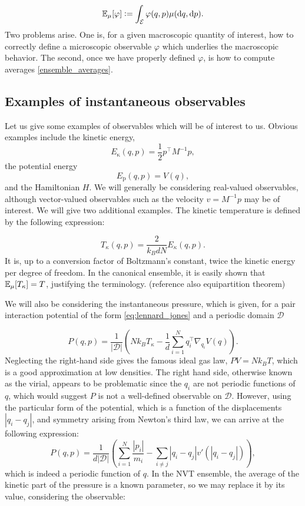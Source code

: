 \begin{equation}
    \label{eq:ensemble_averages}
    \mathbb{E}_\mu[\varphi] \mathrel{\mathop:}= \int_{\mathcal E} \varphi(q,p) \mu(\mathrm{d}q,\mathrm{d}p).
\end{equation}
Two problems arise. One is, for a given macroscopic quantity of interest, how to correctly define a microscopic observable $\varphi$ which underlies the macroscopic behavior. The second, once we have properly defined $\varphi$, is how to compute averages \eqref{ensemble_averages}. 

\subsection{Examples of instantaneous observables}
Let us give some examples of observables which will be of interest to us. Obvious examples include the kinetic energy,
$$ E_{\mathrm \kappa} (q,p) = \frac 12 p^\intercal M^{-1} p,$$
the potential energy
$$ E_{\mathrm p}(q,p)=V(q),$$
and the Hamiltonian $H$. We will generally be considering real-valued observables, although vector-valued observables such as the velocity $v=M^{-1}p$ may be of interest. We will give two additional examples. The kinetic temperature is defined by the following expression:

$$T_\kappa (q,p)= \frac{2}{k_BdN}E_\kappa(q,p).$$
It is, up to a conversion factor of Boltzmann's constant, twice the kinetic energy per degree of freedom. In the canonical ensemble, it is easily shown that $\mathbb{E}_\mu [T_\kappa]=T$, justifying the terminology. (reference also equipartition theorem)

We will also be considering the instantaneous pressure, which is given, for a pair interaction potential of the form \eqref{eq:lennard_jones} and a periodic domain $\mathcal D$

$$P(q,p)=\frac{1}{|\mathcal D|}\left( Nk_B T_{\kappa} -\frac1d\sum_{i=1}^N q_i^\intercal\nabla_{q_i}V(q)\right).$$
Neglecting the right-hand side gives the famous ideal gas law, $PV=Nk_BT$, which is a good approximation at low densities. The right hand side, otherwise known as the virial, appears to be problematic since the $q_i$ are not periodic functions of $q$, which would suggest $P$ is not a well-defined observable on $\mathcal D$.
However, using the particular form of the potential, which is a function of the displacements $|q_i-q_j|$, and symmetry arising from Newton's third law, we can arrive at the following expression:
$$P(q,p)=\frac1{d|\mathcal D|}\left( \sum_{i=1}^N \frac{|p_i|}{m_i}-\sum_{i \neq j}|q_i-q_j|v'(|q_i-q_j|)\right),$$
which is indeed a periodic function of $q$. In the NVT ensemble, the average of the kinetic part of the pressure is a known parameter, so we may replace it by its value, considering the observable:

